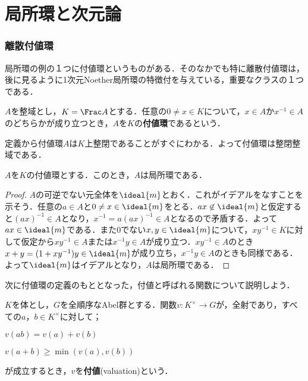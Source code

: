 \newpage
\part[Local ring and Dimension theory]{局所環と次元論}

\section{離散付値環}

局所環の例の１つに付値環というものがある．そのなかでも特に離散付値環は，後に見るように1次元Noether局所環の特徴付を与えている，重要なクラスの１つである．

\begin{defi}[付値環]
	$A$を整域とし，$K=\Frac A$とする．任意の$0\neq x\in K$について，$x\in A$か$x^{-1}\in A$のどちらかが成り立つとき，$A$を$K$の\textbf{付値環}であるという．
\end{defi}

定義から付値環$A$は$K$上整閉であることがすぐにわかる．よって付値環は整閉整域である．

\begin{prop}
	$A$を$K$の付値環とする．このとき，$A$は局所環である．
\end{prop}

\begin{proof}
	$A$の可逆でない元全体を$\ideal{m}$とおく．これがイデアルをなすことを示そう．任意の$a\in A$と$0\neq x\in\ideal{m}$をとる．$ax\not\in\ideal{m}$と仮定すると$(ax)^{-1}\in A$となり，$x^{-1}=a(ax)^{-1}\in A$となるので矛盾する．よって$ax\in \ideal{m}$である．また$0$でない$x,y\in\ideal{m}$について，$xy^{-1}\in K$に対して仮定から$xy^{-1}\in A$または$x^{-1}y\in A$が成り立つ．$xy^{-1}\in A$のとき$x+y=(1+xy^{-1})y\in \ideal{m}$が成り立ち，$x^{-1}y\in A$のときも同様である．よって$\ideal{m}$はイデアルとなり，$A$は局所環である．
\end{proof}

次に付値環の定義のもととなった，付値と呼ばれる関数について説明しよう．

\begin{defi}[付値]
	$K$を体とし，$G$を全順序なAbel群とする．関数$v:K^\times\to G$が，全射であり，すべての$a，b\in K^\times$に対して；
	\begin{sakura}
		\item $v(ab)=v(a)+v(b)$
		\item $v(a+b)\geq\min (v(a),v(b))$
	\end{sakura}
	が成立するとき，$v$を\textbf{付値}(valuation)という．
\end{defi}


